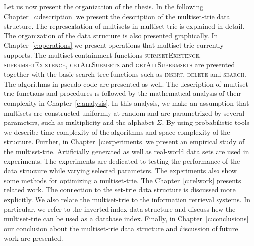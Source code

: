 %
Let us now present the organization of the thesis. 
In the following Chapter~\ref{c:description} we present the description of the 
multiset-trie data structure. The representation of multisets in multiset-trie is 
explained in detail. The organization of the data structure is also presented 
graphically.
%
In Chapter~\ref{c:operations} we present operations that multiset-trie currently 
supports. The multiset containment functions \textsc{submsetExistence}, 
\textsc{supermsetExistence}, \textsc{getAllSubmsets} and \textsc{getAllSupermsets} 
are presented together with the basic search tree functions such as \textsc{insert}, 
\textsc{delete} and \textsc{search}. The algorithms in pseudo code are presented 
as well. 
%
The description of multiset-trie functions and procedures is followed by the 
mathematical analysis of their complexity in Chapter~\ref{c:analysis}. 
In this analysis, we make an assumption that multisets are constructed uniformly at 
random and are parametrized by several parameters, such as multiplicity and the alphabet 
$\Sigma.$ By using probabilistic tools we describe time complexity of the algorithms 
and space complexity of the structure.
%
Further, in Chapter~\ref{c:experiments} we present an empirical study of the 
multiset-trie. Artificially generated as well as real-world data sets are used in experiments. 
The experiments are dedicated to testing the performance of the data structure while 
varying selected parameters. The experiments also show some methods for 
optimizing a multiset-trie.
%
The Chapter~\ref{c:relwork} presents related work. The connection to the set-trie 
data structure \cite{savnik2013index} is discussed more explicitly. We also relate 
the multiset-trie to the information retrieval systems. In particular, we refer to the 
inverted index data structure and discuss how the multiset-trie can be used as a 
database index.
%
Finally, in Chapter~\ref{c:conclusions} our conclusion about the multiset-trie 
data structure and discussion of future work are presented.